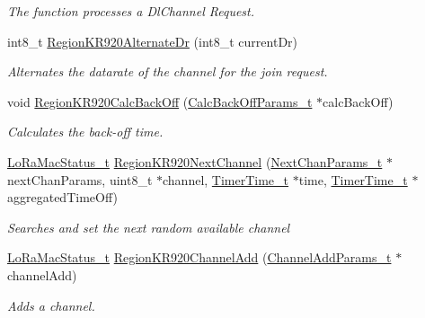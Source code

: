 \begin{DoxyCompactItemize}
\begin{DoxyCompactList}\small\item\em The function processes a Dl\+Channel Request. \end{DoxyCompactList}\item 
int8\+\_\+t \mbox{\hyperlink{group___r_e_g_i_o_n_k_r920_gafbbabd04dcb78c5aff53adfc758634d6}{Region\+K\+R920\+Alternate\+Dr}} (int8\+\_\+t current\+Dr)
\begin{DoxyCompactList}\small\item\em Alternates the datarate of the channel for the join request. \end{DoxyCompactList}\item 
void \mbox{\hyperlink{group___r_e_g_i_o_n_k_r920_ga4a2b24e17bcd83d8cb9166e3e4c57bb6}{Region\+K\+R920\+Calc\+Back\+Off}} (\mbox{\hyperlink{group___r_e_g_i_o_n_ga7c5c9a8da174e6679eded8257dc92fd9}{Calc\+Back\+Off\+Params\+\_\+t}} $\ast$calc\+Back\+Off)
\begin{DoxyCompactList}\small\item\em Calculates the back-\/off time. \end{DoxyCompactList}\item 
\mbox{\hyperlink{group___l_o_r_a_m_a_c_ga30bd25657e10480f8605ee951b0ecfbd}{Lo\+Ra\+Mac\+Status\+\_\+t}} \mbox{\hyperlink{group___r_e_g_i_o_n_k_r920_gab4f314ad8cfdb98c239248cf372d5325}{Region\+K\+R920\+Next\+Channel}} (\mbox{\hyperlink{group___r_e_g_i_o_n_ga115f5e83afae352c0a3dcdc193374040}{Next\+Chan\+Params\+\_\+t}} $\ast$next\+Chan\+Params, uint8\+\_\+t $\ast$channel, \mbox{\hyperlink{utilities_8h_a4215ca43d3e953099ea758ce428599d0}{Timer\+Time\+\_\+t}} $\ast$time, \mbox{\hyperlink{utilities_8h_a4215ca43d3e953099ea758ce428599d0}{Timer\+Time\+\_\+t}} $\ast$aggregated\+Time\+Off)
\begin{DoxyCompactList}\small\item\em Searches and set the next random available channel \end{DoxyCompactList}\item 
\mbox{\hyperlink{group___l_o_r_a_m_a_c_ga30bd25657e10480f8605ee951b0ecfbd}{Lo\+Ra\+Mac\+Status\+\_\+t}} \mbox{\hyperlink{group___r_e_g_i_o_n_k_r920_gaca1aceccde474cc473e09dc3113ec876}{Region\+K\+R920\+Channel\+Add}} (\mbox{\hyperlink{group___r_e_g_i_o_n_gab1c5f3aa06614283202906cef4417860}{Channel\+Add\+Params\+\_\+t}} $\ast$channel\+Add)
\begin{DoxyCompactList}\small\item\em Adds a channel. \end{DoxyCompactList}\item 

\end{DoxyCompactItemize}
